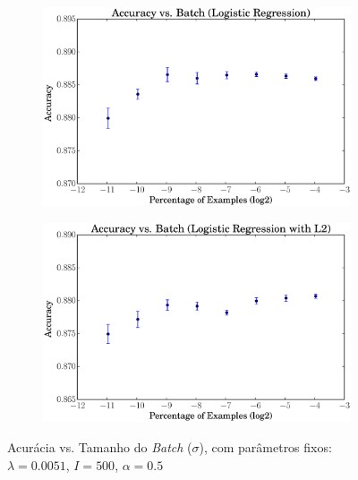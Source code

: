 \documentclass[a4paper, 12pt]{article}
\begin{document}
\begin{figure}[htpb]
\begin{subfigure}[htpb]{0.45\textwidth}
        \includegraphics[width=\textwidth]{acc_vs_batchp_logreg}
        \caption{}
        \label{fig:batch_logreg}
    \end{subfigure}
    \begin{subfigure}[htpb]{0.45\textwidth}
        \includegraphics[width=\textwidth]{acc_vs_batchp_logregL2}
        \caption{}
        \label{fig:batch_logregL2}
    \end{subfigure}
    \caption{Acurácia vs. Tamanho do \textit{Batch} ($\sigma$), com
    parâmetros fixos: $\lambda=0.0051$, $I=500$, $\alpha=0.5$}\label{fig:batch}
\end{figure}
\end{document}

